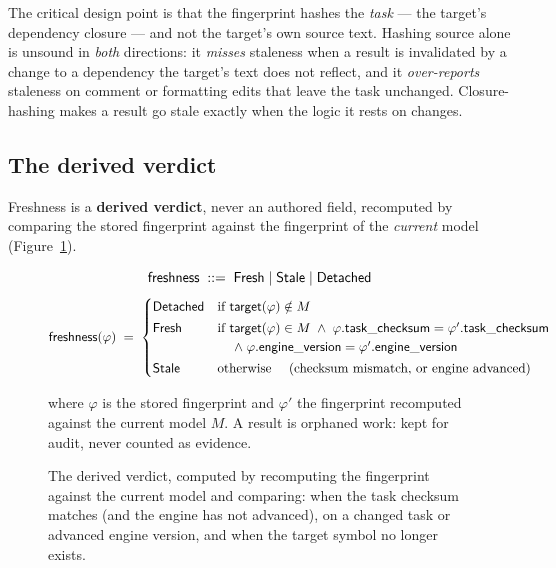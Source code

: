The critical design point is that the fingerprint hashes the \emph{task} --- the target's dependency
closure --- and not the target's own source text. Hashing source alone is unsound in \emph{both}
directions: it \emph{misses} staleness when a result is invalidated by a change to a dependency the
target's text does not reflect, and it \emph{over-reports} staleness on comment or formatting edits
that leave the task unchanged. Closure-hashing makes a result go stale exactly when the logic it rests
on changes.

\subsection{The derived verdict}\label{sec:freshness-verdict}

Freshness is a \textbf{derived verdict}, never an authored field, recomputed by comparing the
stored fingerprint against the fingerprint of the \emph{current} model (Figure~\ref{fig:fmt-freshness}).

\begin{figure}[H]
\centering
\small
\[
\mathsf{freshness} \;::=\; \mathsf{Fresh} \mid \mathsf{Stale} \mid \mathsf{Detached}
\]
\[
\mathsf{freshness}(\varphi) \;=\;
\begin{cases}
\mathsf{Detached} & \text{if } \mathsf{target}(\varphi) \notin M\\[2pt]
\mathsf{Fresh}    & \text{if } \mathsf{target}(\varphi) \in M \;\land\; \varphi.\mathsf{task\_checksum} = \varphi'.\mathsf{task\_checksum}\\
              & \quad\;\land\; \varphi.\mathsf{engine\_version} = \varphi'.\mathsf{engine\_version}\\[2pt]
\mathsf{Stale}    & \text{otherwise \quad(checksum mismatch, or engine advanced)}
\end{cases}
\]
\vspace{-2pt}
\begin{minipage}{\linewidth}
{\footnotesize where $\varphi$ is the stored fingerprint and $\varphi'$ the fingerprint recomputed against the current model $M$. A  result is orphaned work: kept for audit, never counted as evidence.\par}
\end{minipage}
\caption{The derived  verdict, computed by recomputing the fingerprint against the current model and comparing:  when the task checksum matches (and the engine has not advanced),  on a changed task or advanced engine version, and  when the target symbol no longer exists.}
\label{fig:fmt-freshness}
\end{figure}

